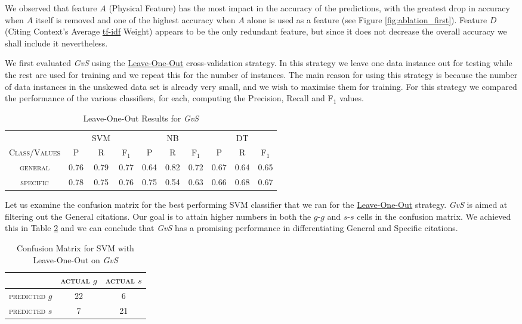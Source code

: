 We observed that feature $A$ (Physical Feature) has the most impact in the accuracy of the predictions, with the greatest drop in accuracy when $A$ itself is removed and one of the highest accuracy when $A$ alone is used as a feature (see Figure \ref{fig:ablation_first}). Feature $D$ (Citing Context's Average \url{tf-idf} Weight) appears to be the only redundant feature, but since it does not decrease the overall accuracy we shall include it nevertheless.

We first evaluated {\it GvS} using the \url{Leave-One-Out} cross-validation strategy. In this strategy we leave one data instance out for testing while the rest are used for training and we repeat this for the number of instances. The main reason for using this strategy is because the number of data instances in the unskewed data set is already very small, and we wish to maximise them for training. For this strategy we compared the performance of the various classifiers, for each, computing the Precision, Recall and F$_1$ values.

\begin{table}[h]
	\center
	\begin{tabular}{ c | c  c  c | c c c | c c c}
		& & SVM & & & NB & & & DT \\
		\textsc{Class/Values} & \textsc{P} & \textsc{R} & \textsc{F$_1$} & \textsc{P} & \textsc{R} & \textsc{F$_1$} & \textsc{P} & \textsc{R} & \textsc{F$_1$} \\
		\hline
		\textsc{general} 			& 0.76  &    0.79   &   0.77 & 0.64   &   0.82   &   0.72 & 0.67  &    0.64  &    0.65 \\
		\textsc{specific} 			& 0.78  &    0.75   &   0.76 & 0.75   &   0.54   &   0.63 & 0.66  &    0.68  &    0.67 \\
	\end{tabular}
	\caption{Leave-One-Out Results for {\it GvS}}
	\label{tab:firsttieresults}
\end{table}

Let us examine the confusion matrix for the best performing SVM classifier that we ran for the \url{Leave-One-Out} strategy. {\it GvS} is aimed at filtering out the General citations. Our goal is to attain higher numbers in both the $g$-$g$ and $s$-$s$ cells in the confusion matrix. We achieved this in Table \ref{tab:firstsvmconfusionmatrix} and we can conclude that {\it GvS} has a promising performance in differentiating General and Specific citations.

\begin{table}[h]
	\center
	\begin{tabular}{ c | c  c }
		 & \textsc{actual $g$} & \textsc{actual $s$} \\
		\hline
		\textsc{predicted $g$} 	& 22 & 6 \\
		\textsc{predicted $s$}		& 7 & 21
	\end{tabular}
	\caption{Confusion Matrix for SVM with Leave-One-Out on {\it GvS}}
	\label{tab:firstsvmconfusionmatrix}
\end{table}

